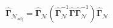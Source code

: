 \begin{equation}
    \hat{\boldsymbol{\Gamma}}_{\mathcal{N}_{\mathrm{adj}}}
    =
    \hat{\boldsymbol{\Gamma}}_{\mathcal{N}}
    \left(
    \hat{\boldsymbol{\Gamma}}_{\mathcal{N}}^{-1}
    \hat{\boldsymbol{\Gamma}}
    \hat{\boldsymbol{\Gamma}}_{\mathcal{N}}^{-1}
    \right)
    \hat{\boldsymbol{\Gamma}}_{\mathcal{N}}
    \label{eq:gammaMatrix-gammacap-mvn-adj-estimator}   
\end{equation}
